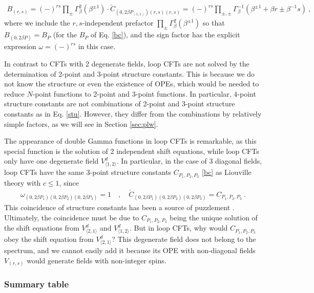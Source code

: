 \documentclass[12pt, a4paper]{article}
\begin{document}
\begin{align}
 \boxed{B_{(r,s)} = (-)^{rs}\prod_\pm \Gamma_\beta^{2}\left(\beta^{\pm 1}\right)\cdot \check{C}_{(0,2\beta P_{(1,1)})(r,s)(r,s)} =  (-)^{rs}\prod_{\pm,\pm}\Gamma_\beta^{-1}\left(\beta^{\pm 1}+\beta r \pm \beta^{-1}s\right)}  \ ,
  \label{bref}
\end{align}
where we include the $r,s$-independent prefactor $\prod_\pm \Gamma_\beta^{2}\left(\beta^{\pm 1}\right)$ so that $B_{(0,2\beta P)}=B_P$ (for the $B_P$ of Eq. \eqref{bc}), and the sign factor has the explicit expression $\omega=(-)^{rs}$ in this case.

In contrast to CFTs with 2 degenerate fields, loop CFTs are not solved by the determination of 2-point and 3-point structure constants. This is because we do not know the structure or even the existence of OPEs, which would be needed to reduce $N$-point functions to 2-point and 3-point functions. In particular, 4-point structure constants are not combinations of 2-point and 3-point structure constants as in Eq. \eqref{stu}. However, they differ from the combinations by relatively simple factors, as we will see in Section \ref{sec:plw}.

The appearance of double Gamma functions in loop CFTs is remarkable, as this special function is the solution of 2 independent shift equations, while loop CFTs only have one degenerate field $V^d_{\langle 1,2\rangle}$. In particular, in the case of 3 diagonal fields, loop CFTs have the same 3-point structure constants $C_{P_1,P_2,P_3}$ \eqref{bc} as Liouville theory with $c\leq 1$, since
\begin{align}
\omega_{(0,2\beta P_1)(0,2\beta P_2)(0,2\beta P_3)} = 1 \quad , \quad \check{C}_{(0,2\beta P_1)(0,2\beta P_2)(0,2\beta P_3)} = C_{P_1,P_2,P_3}\ .
\end{align}
This coincidence of structure constants  has been a source of puzzlement \cite{ijs15, rib22}. Ultimately, the coincidence must be due to $C_{P_1,P_2,P_3}$ being the unique solution of the shift equations from $V^d_{\langle 2,1\rangle}$ and $V^d_{\langle 1,2\rangle}$. But in loop CFTs, why would $C_{P_1,P_2,P_3}$ obey the shift equation from $V^d_{\langle 2,1\rangle}$? This degenerate field does not belong to the spectrum, and we cannot easily add it because its OPE with non-diagonal fields $V_{(r,s)}$ would generate fields with non-integer spins.

\subsubsection{Summary table}\label{sec:table}
\end{document}
